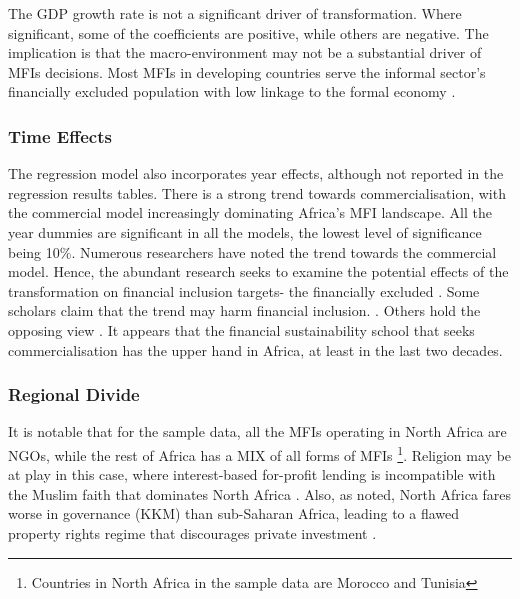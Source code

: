 \documentclass[a4paper, nobind]{templates/ociamthesis}
\begin{document}
The GDP growth rate is not a significant driver of transformation. Where significant, some of the coefficients are positive, while others are negative. The implication is that the macro-environment may not be a substantial driver of MFIs decisions. Most MFIs in developing countries serve the informal sector's financially excluded population with low linkage to the formal economy \autocite{ghosh2013microfinance}.

\hypertarget{time-effects}{%
\subsubsection{Time Effects}\label{time-effects}}

The regression model also incorporates year effects, although not reported in the regression results tables. There is a strong trend towards commercialisation, with the commercial model increasingly dominating Africa's MFI landscape. All the year dummies are significant in all the models, the lowest level of significance being 10\%. Numerous researchers have noted the trend towards the commercial model. Hence, the abundant research seeks to examine the potential effects of the transformation on financial inclusion targets- the financially excluded \autocite{d2017ngos}. Some scholars claim that the trend may harm financial inclusion. \autocite{meagher2006microfinance,hartarska2007regulated}. Others hold the opposing view \autocite{duvendack2015mis}. It appears that the financial sustainability school that seeks commercialisation has the upper hand in Africa, at least in the last two decades.

\hypertarget{regional-divide}{%
\subsubsection{Regional Divide}\label{regional-divide}}

It is notable that for the sample data, all the MFIs operating in North Africa are NGOs, while the rest of Africa has a MIX of all forms of MFIs \footnote{Countries in North Africa in the sample data are Morocco and Tunisia}. Religion may be at play in this case, where interest-based for-profit lending is incompatible with the Muslim faith that dominates North Africa \autocite{hassan2018religious}. Also, as noted, North Africa fares worse in governance (KKM) than sub-Saharan Africa, leading to a flawed property rights regime that discourages private investment \autocite{johnson2002property,claessens2003financial}.
\end{document}
